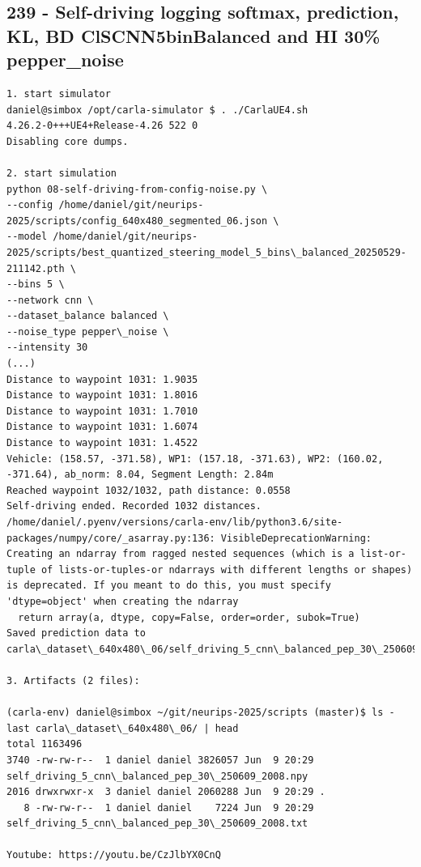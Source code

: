 \subsection{239 - Self-driving logging softmax, prediction, KL, BD ClSCNN5binBalanced and HI 30\% pepper\_noise}
\label{app_res:239}
\begin{verbatim}
1. start simulator
daniel@simbox /opt/carla-simulator $ . ./CarlaUE4.sh 
4.26.2-0+++UE4+Release-4.26 522 0
Disabling core dumps.

2. start simulation
python 08-self-driving-from-config-noise.py \
--config /home/daniel/git/neurips-2025/scripts/config_640x480_segmented_06.json \
--model /home/daniel/git/neurips-2025/scripts/best_quantized_steering_model_5_bins\_balanced_20250529-211142.pth \
--bins 5 \
--network cnn \
--dataset_balance balanced \
--noise_type pepper\_noise \
--intensity 30   
(...)
Distance to waypoint 1031: 1.9035
Distance to waypoint 1031: 1.8016
Distance to waypoint 1031: 1.7010
Distance to waypoint 1031: 1.6074
Distance to waypoint 1031: 1.4522
Vehicle: (158.57, -371.58), WP1: (157.18, -371.63), WP2: (160.02, -371.64), ab_norm: 8.04, Segment Length: 2.84m
Reached waypoint 1032/1032, path distance: 0.0558
Self-driving ended. Recorded 1032 distances.
/home/daniel/.pyenv/versions/carla-env/lib/python3.6/site-packages/numpy/core/_asarray.py:136: VisibleDeprecationWarning: Creating an ndarray from ragged nested sequences (which is a list-or-tuple of lists-or-tuples-or ndarrays with different lengths or shapes) is deprecated. If you meant to do this, you must specify 'dtype=object' when creating the ndarray
  return array(a, dtype, copy=False, order=order, subok=True)
Saved prediction data to carla\_dataset\_640x480\_06/self_driving_5_cnn\_balanced_pep_30\_250609_2008.npy

3. Artifacts (2 files):

(carla-env) daniel@simbox ~/git/neurips-2025/scripts (master)$ ls -last carla\_dataset\_640x480\_06/ | head
total 1163496
3740 -rw-rw-r--  1 daniel daniel 3826057 Jun  9 20:29 self_driving_5_cnn\_balanced_pep_30\_250609_2008.npy
2016 drwxrwxr-x  3 daniel daniel 2060288 Jun  9 20:29 .
   8 -rw-rw-r--  1 daniel daniel    7224 Jun  9 20:29 self_driving_5_cnn\_balanced_pep_30\_250609_2008.txt

Youtube: https://youtu.be/CzJlbYX0CnQ

\end{verbatim}

